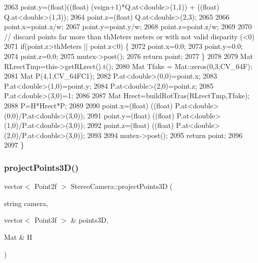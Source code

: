 \begin{DoxyCode}
2063     point.y=(float)((\textcolor{keywordtype}{float}) (vsign+1)*Q.at<\textcolor{keywordtype}{double}>(1,1)) + ((\textcolor{keywordtype}{float}) Q.at<\textcolor{keywordtype}{double}>(1,3));
2064     point.z=(float) Q.at<\textcolor{keywordtype}{double}>(2,3);
2065 
2066     point.x=point.x/w;
2067     point.y=point.y/w;
2068     point.z=point.z/w;
2069 
2070     \textcolor{comment}{// discard points far more than thMeters meters or with not valid disparity (<0)}
2071     \textcolor{keywordflow}{if}(point.z>thMeters || point.z<0) \{
2072         point.x=0.0;
2073         point.y=0.0;
2074         point.z=0.0;
2075         mutex->post();
2076         \textcolor{keywordflow}{return} point;
2077     \}
2078 
2079     Mat RLrectTmp=this->getRLrect().t();
2080     Mat Tfake = Mat::zeros(0,3,CV\_64F);
2081     Mat P(4,1,CV\_64FC1);
2082     P.at<\textcolor{keywordtype}{double}>(0,0)=point.x;
2083     P.at<\textcolor{keywordtype}{double}>(1,0)=point.y;
2084     P.at<\textcolor{keywordtype}{double}>(2,0)=point.z;
2085     P.at<\textcolor{keywordtype}{double}>(3,0)=1;
2086 
2087     Mat Hrect=buildRotTras(RLrectTmp,Tfake);
2088     P=H*Hrect*P;
2089 
2090     point.x=(float) ((\textcolor{keywordtype}{float}) P.at<\textcolor{keywordtype}{double}>(0,0)/P.at<\textcolor{keywordtype}{double}>(3,0));
2091     point.y=(float) ((\textcolor{keywordtype}{float}) P.at<\textcolor{keywordtype}{double}>(1,0)/P.at<\textcolor{keywordtype}{double}>(3,0));
2092     point.z=(float) ((\textcolor{keywordtype}{float}) P.at<\textcolor{keywordtype}{double}>(2,0)/P.at<\textcolor{keywordtype}{double}>(3,0));
2093 
2094     mutex->post();
2095     \textcolor{keywordflow}{return} point;
2096 
2097 \}
\end{DoxyCode}
\mbox{\label{classStereoCamera_a03406c9d31c1b765a8d6ef9641222309}} 
\subsubsection{\texorpdfstring{project\+Points3\+D()}{projectPoints3D()}}
{\footnotesize\ttfamily vector$<$ Point2f $>$ Stereo\+Camera\+::project\+Points3D (\begin{DoxyParamCaption}\item[{string}]{camera,  }\item[{vector$<$ Point3f $>$ \&}]{points3D,  }\item[{Mat \&}]{H }\end{DoxyParamCaption})}



